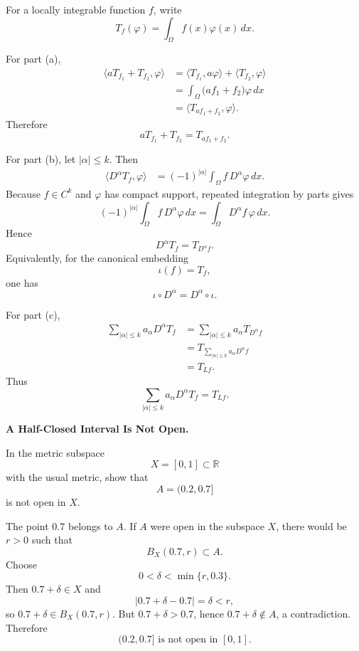 \begin{solution}
For a locally integrable function \(f\), write
\[
T_f(\varphi)=\int_\Omega f(x)\varphi(x)\,dx.
\]

For part (a),
\[
\begin{aligned}
\langle aT_{f_1}+T_{f_2},\varphi\rangle
&=
\langle T_{f_1},a\varphi\rangle
+
\langle T_{f_2},\varphi\rangle\\
&=
\int_\Omega
\bigl(af_1+f_2\bigr)\varphi\,dx\\
&=
\langle T_{af_1+f_2},\varphi\rangle.
\end{aligned}
\]
Therefore
\[
\boxed{
aT_{f_1}+T_{f_2}=T_{af_1+f_2}.
}
\]

For part (b), let \(|\alpha|\le k\). Then
\[
\begin{aligned}
\langle D^\alpha T_f,\varphi\rangle
&=
(-1)^{|\alpha|}
\int_\Omega f\,D^\alpha\varphi\,dx.
\end{aligned}
\]
Because \(f\in C^k\) and \(\varphi\) has compact support, repeated integration by parts gives
\[
(-1)^{|\alpha|}
\int_\Omega f\,D^\alpha\varphi\,dx
=
\int_\Omega D^\alpha f\,\varphi\,dx.
\]
Hence
\[
\boxed{
D^\alpha T_f=T_{D^\alpha f}.
}
\]
Equivalently, for the canonical embedding
\[
\iota(f)=T_f,
\]
one has
\[
\boxed{
\iota\circ D^\alpha
=
D^\alpha\circ\iota.
}
\]

For part (c),
\[
\begin{aligned}
\sum_{|\alpha|\le k}
a_\alpha D^\alpha T_f
&=
\sum_{|\alpha|\le k}
a_\alpha T_{D^\alpha f}\\
&=
T_{\sum_{|\alpha|\le k}a_\alpha D^\alpha f}\\
&=
T_{Lf}.
\end{aligned}
\]
Thus
\[
\boxed{
\sum_{|\alpha|\le k}
a_\alpha D^\alpha T_f
=
T_{Lf}.
}
\]
\end{solution}


\begin{problem}[CP-II-0101]
\label{prob:cp-ii-0101}
\textbf{A Half-Closed Interval Is Not Open.}

\hspace*{1.5em}In the metric subspace
\[
X=[0,1]\subset\mathbb R
\]
with the usual metric, show that
\[
A=(0.2,0.7]
\]
is not open in \(X\).
\end{problem}

\begin{solution}
The point \(0.7\) belongs to \(A\). If \(A\) were open in the subspace
\(X\), there would be \(r>0\) such that
\[
B_X(0.7,r)\subset A.
\]
Choose
\[
0<\delta<\min\{r,0.3\}.
\]
Then \(0.7+\delta\in X\) and
\[
|0.7+\delta-0.7|=\delta<r,
\]
so \(0.7+\delta\in B_X(0.7,r)\). But \(0.7+\delta>0.7\), hence
\(0.7+\delta\notin A\), a contradiction. Therefore
\[
\boxed{(0.2,0.7]\text{ is not open in }[0,1].}
\]
\end{solution}



